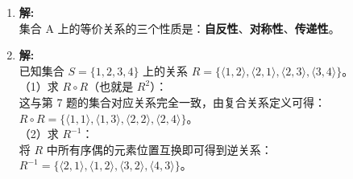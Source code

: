 \begin{enumerate}
	\vspace{1em}
	
	\item \textbf{解:}\\
	集合 A 上的等价关系的三个性质是：\textbf{自反性}、\textbf{对称性}、\textbf{传递性}。
	
	\vspace{1em}
	
	\item \textbf{解:}\\
	已知集合 $S = \{1, 2, 3, 4\}$ 上的关系 $R = \{\langle 1, 2 \rangle, \langle 2, 1 \rangle, \langle 2, 3 \rangle, \langle 3, 4 \rangle\}$。\\
	（1）求 $R \circ R$（也就是 $R^2$）：\\
	这与第 7 题的集合对应关系完全一致，由复合关系定义可得：\\
	$R \circ R = \{\langle 1, 1 \rangle, \langle 1, 3 \rangle, \langle 2, 2 \rangle, \langle 2, 4 \rangle\}$。\\
	（2）求 $R^{-1}$：\\
	将 $R$ 中所有序偶的元素位置互换即可得到逆关系：\\
	$R^{-1} = \{\langle 2, 1 \rangle, \langle 1, 2 \rangle, \langle 3, 2 \rangle, \langle 4, 3 \rangle\}$。
	
\end{enumerate}















